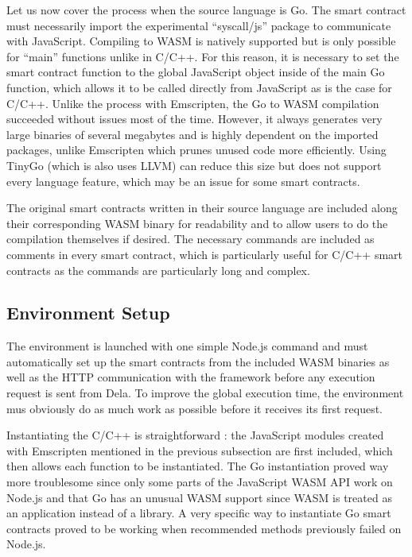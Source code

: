 \documentclass[11pt, a4paper, twoside, openright]{article}
\begin{document}
Let us now cover the process when the source language is Go. The smart contract must necessarily import the experimental ``syscall/js'' package to communicate with JavaScript. Compiling to WASM is natively supported but is only possible for ``main'' functions unlike in C/C++. For this reason, it is necessary to set the smart contract function to the global JavaScript object inside of the main Go function, which allows it to be called directly from JavaScript as is the case for C/C++. Unlike the process with Emscripten, the Go to WASM compilation succeeded without issues most of the time. However, it always generates very large binaries of several megabytes and is highly dependent on the imported packages, unlike Emscripten which prunes unused code more efficiently. Using TinyGo \cite{tinygo} (which is also uses LLVM) can reduce this size but does not support every language feature, which may be an issue for some smart contracts.

The original smart contracts written in their source language are included along their corresponding WASM binary for readability and to allow users to do the compilation themselves if desired. The necessary commands are included as comments in every smart contract, which is particularly useful for C/C++ smart contracts as the commands are particularly long and complex.

\subsection{Environment Setup}

The environment is launched with one simple Node.js command and must automatically set up the smart contracts from the included WASM binaries as well as the HTTP communication with the framework before any execution request is sent from Dela. To improve the global execution time, the environment mus obviously do as much work as possible before it receives its first request.

Instantiating the C/C++ is straightforward : the JavaScript modules created with Emscripten mentioned in the previous subsection are first included, which then allows each function to be instantiated. The Go instantiation proved way more troublesome since only some parts of the JavaScript WASM API work on Node.js and that Go has an unusual WASM support since WASM is treated as an application instead of a library. A very specific way to instantiate Go smart contracts proved to be working when recommended methods previously failed on Node.js. 
\end{document}
